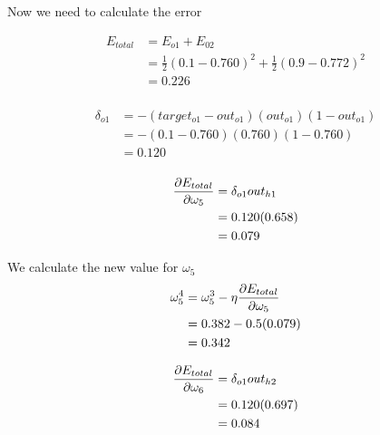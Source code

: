 \documentclass[10pt,a4paper]{article}
\begin{document}
Now we need to calculate the error

\begin{equation}
\begin{split}
E_{total} &= E_{o1} + E_{02} \\
          &= \frac{1}{2}(0.1-0.760)^2 + \frac{1}{2}(0.9 - 0.772)^2 \\
          &= 0.226 \\
\end{split}
\end{equation}

\begin{equation}
\begin{split}
\delta_{o1} &= -(target_{o1} -out_{o1})(out_{o1})(1-out_{o1})\\
            &= -(0.1-0.760)(0.760)(1-0.760)\\
            &= 0.120\\
\end{split}
\end{equation}

\begin{equation}
\begin{split}
\pdv{E_{total}}{\omega_5} &= \delta_{o1}out_{h1}\\
                          &= 0.120(0.658)\\
                          &= 0.079\\
\end{split}
\end{equation}

We calculate the new value for $\omega_5$
\begin{equation}
\begin{split}
\omega_5^4 &= \omega_5^3 - \eta\pdv{E_{total}}{\omega_5}\\
           &= 0.382 -0.5(0.079)\\
           &= 0.342\\
\end{split}
\end{equation}

\begin{equation}
\begin{split}
\pdv{E_{total}}{\omega_6} &= \delta_{o1}out_{h2}\\
                          &= 0.120(0.697)\\
                          &= 0.084\\
\end{split}
\end{equation}
\end{document}
